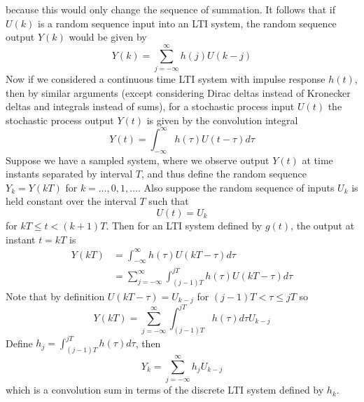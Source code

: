 \documentclass[11pt]{report} %
\begin{document}
because this would only change the sequence of summation. It follows that if $U\left(k\right)$ is a random sequence input into an LTI system, the random sequence output $Y\left(k\right)$ would be given by
\begin{equation}
Y\left(k\right) = \sum_{j = -\infty}^{\infty}h\left(j\right)U\left(k - j\right)
\end{equation}
Now if we considered a continuous time LTI system with impulse response $h\left(t\right)$, then by similar arguments (except considering Dirac deltas instead of Kronecker deltas and integrals instead of sums), for a stochastic process input $U\left(t\right)$ the stochastic process output $Y\left(t\right)$ is given by the convolution integral
\begin{equation}
Y\left(t\right) = \int_{-\infty}^{\infty}h\left(\tau\right)U\left(t - \tau\right)d\tau
\end{equation}
Suppose we have a sampled system, where we observe output $Y\left(t\right)$ at time instants separated by interval $T$, and thus define the random sequence $Y_{k} = Y\left(kT\right)$ for $k = \dots, 0, 1, \dots$. Also suppose the random sequence of inputs $U_{k}$ is held constant over the interval $T$ such that
\begin{equation}
U\left(t\right) = U_{k}
\end{equation}
for $kT \leq t < \left(k + 1\right)T$. Then for an LTI system defined by $g\left(t\right)$, the output at instant $t = kT$ is
\begin{align}
Y\left(kT\right) &= \int_{-\infty}^{\infty}h\left(\tau\right)U\left(kT - \tau\right)d\tau \\
&= \sum_{j = -\infty}^{\infty}\int_{\left(j - 1\right)T}^{jT}h\left(\tau\right)U\left(kT - \tau\right)d\tau
\end{align}
Note that by definition $U\left(kT - \tau\right) = U_{k - j}$ for $\left(j - 1\right)T < \tau \leq jT$ so
\begin{equation}
Y\left(kT\right) = \sum_{j = -\infty}^{\infty}\int_{\left(j - 1\right)T}^{jT}h\left(\tau\right)d\tau U_{k - j}
\end{equation}
Define $h_{j} = \int_{\left(j - 1\right)T}^{jT}h\left(\tau\right)d\tau$, then
\begin{equation}
Y_{k} = \sum_{j = -\infty}^{\infty}h_{j}U_{k - j}
\end{equation}
which is a convolution sum in terms of the discrete LTI system defined by $h_{k}$. \\
\end{document}
